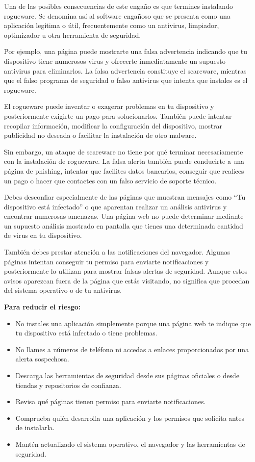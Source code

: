 \documentclass[
  spanish,
  a4paper,
  openany]{book}
\begin{document}
Una de las posibles consecuencias de este engaño es que termines instalando rogueware. Se denomina así al software engañoso que se presenta como una aplicación legítima o útil, frecuentemente como un antivirus, limpiador, optimizador u otra herramienta de seguridad.

Por ejemplo, una página puede mostrarte una falsa advertencia indicando que tu dispositivo tiene numerosos virus y ofrecerte inmediatamente un supuesto antivirus para eliminarlos. La falsa advertencia constituye el scareware, mientras que el falso programa de seguridad o falso antivirus que intenta que instales es el rogueware.

El rogueware puede inventar o exagerar problemas en tu dispositivo y posteriormente exigirte un pago para solucionarlos. También puede intentar recopilar información, modificar la configuración del dispositivo, mostrar publicidad no deseada o facilitar la instalación de otro malware.

Sin embargo, un ataque de scareware no tiene por qué terminar necesariamente con la instalación de rogueware. La falsa alerta también puede conducirte a una página de phishing, intentar que facilites datos bancarios, conseguir que realices un pago o hacer que contactes con un falso servicio de soporte técnico.

Debes desconfiar especialmente de las páginas que muestran mensajes como ``Tu dispositivo está infectado'' o que aparentan realizar un análisis antivirus y encontrar numerosas amenazas. Una página web no puede determinar mediante un supuesto análisis mostrado en pantalla que tienes una determinada cantidad de virus en tu dispositivo.

También debes prestar atención a las notificaciones del navegador. Algunas páginas intentan conseguir tu permiso para enviarte notificaciones y posteriormente lo utilizan para mostrar falsas alertas de seguridad. Aunque estos avisos aparezcan fuera de la página que estás visitando, no significa que procedan del sistema operativo o de tu antivirus.

\textbf{Para reducir el riesgo:}

\begin{itemize}
\item
  No instales una aplicación simplemente porque una página web te indique que tu dispositivo está infectado o tiene problemas.
\item
  No llames a números de teléfono ni accedas a enlaces proporcionados por una alerta sospechosa.
\item
  Descarga las herramientas de seguridad desde sus páginas oficiales o desde tiendas y repositorios de confianza.
\item
  Revisa qué páginas tienen permiso para enviarte notificaciones.
\item
  Comprueba quién desarrolla una aplicación y los permisos que solicita antes de instalarla.
\item
  Mantén actualizado el sistema operativo, el navegador y las herramientas de seguridad.
\end{itemize}
\end{document}
